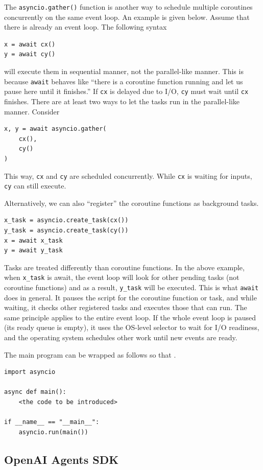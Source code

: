 The \texttt{asyncio.gather()} function is another way to schedule multiple coroutines concurrently on the same event loop. An example is given below. Assume that there is already an event loop. The following syntax
\begin{lstlisting}
x = await cx()
y = await cy()
\end{lstlisting}
will execute them in sequential manner, not the parallel-like manner. This is because \verb|await| behaves like ``there is a coroutine function running and let us pause here until it finishes.'' If \verb|cx| is delayed due to I/O, \verb|cy| must wait until \verb|cx| finishes. There are at least two ways to let the tasks run in the parallel-like manner. Consider
\begin{lstlisting}
x, y = await asyncio.gather(
    cx(), 
    cy()
)
\end{lstlisting}
This way, \verb|cx| and \verb|cy| are scheduled concurrently. While \verb|cx| is waiting for inputs, \verb|cy| can still execute. 

Alternatively, we can also ``register'' the coroutine functions as background tasks.
\begin{lstlisting}
x_task = asyncio.create_task(cx())
y_task = asyncio.create_task(cy())
x = await x_task
y = await y_task
\end{lstlisting}
Tasks are treated differently than coroutine functions. In the above example, when \verb|x_task| is await, the event loop will look for other pending tasks (not coroutine functions) and as a result, \verb|y_task| will be executed. This is what \verb|await| does in general. It pauses the script for the coroutine function or task, and while waiting, it checks other registered tasks and executes those that can run. The same principle applies to the entire event loop. If the whole event loop is paused (its ready queue is empty), it uses the OS-level selector to wait for I/O readiness, and the operating system schedules other work until new events are ready.

The main program can be wrapped as follows so that .
\begin{lstlisting}
import asyncio

async def main():
	<the code to be introduced>
	
if __name__ == "__main__":
	asyncio.run(main())
\end{lstlisting}

\subsection{OpenAI Agents SDK} \label{sec:openaisgentssdk}

